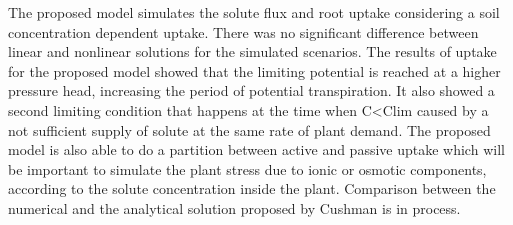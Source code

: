 The proposed model simulates the solute flux and root uptake considering a soil concentration dependent uptake. There was no significant difference between linear and nonlinear solutions for the simulated scenarios. The results of uptake for the proposed model showed that the limiting potential is reached at a higher pressure head, increasing the period of potential transpiration. It also showed a second limiting condition that happens at the time when C<Clim caused by a not sufficient supply of solute at the same rate of plant demand. The proposed model is also able to do a partition between active and passive uptake which will be important to simulate the plant stress due to ionic or osmotic components, according to the solute concentration inside the plant.
Comparison between the numerical and the analytical solution proposed by Cushman is in process.

